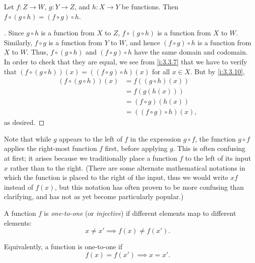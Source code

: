 \setcounter{thm}{11}
\begin{lem}\label{i:3.3.12}
  Let \(f : Z \to W\), \(g : Y \to Z\), and \(h : X \to Y\) be functions.
  Then \(f \circ (g \circ h) = (f \circ g) \circ h\).
\end{lem}

\begin{proof}[]
  Since \(g \circ h\) is a function from \(X\) to \(Z\), \(f \circ (g \circ h)\) is a function from \(X\) to \(W\).
  Similarly, \(f \circ g\) is a function from \(Y\) to \(W\), and hence \((f \circ g) \circ h\) is a function from \(X\) to \(W\).
  Thus, \(f \circ (g \circ h)\) and \((f \circ g) \circ h\) have the same domain and codomain.
  In order to check that they are equal, we see from \cref{i:3.3.7} that we have to verify that \((f \circ (g \circ h))(x) = ((f \circ g) \circ h)(x)\) for all \(x \in X\).
  But by \cref{i:3.3.10},
  \begin{align*}
    (f \circ (g \circ h))(x)
     & = f((g \circ h)(x))         \\
     & = f(g(h(x)))                \\
     & = (f \circ g)(h(x))         \\
     & = ((f \circ g) \circ h)(x),
  \end{align*}
  as desired.
\end{proof}

\begin{rmk}\label{i:3.3.13}
  Note that while \(g\) appears to the left of \(f\) in the expression \(g \circ f\), the function \(g \circ f\) applies the right-most function \(f\) first, before applying \(g\).
  This is often confusing at first;
  it arises because we traditionally place a function \(f\) to the left of its input \(x\) rather than to the right.
  (There are some alternate mathematical notations in which the function is placed to the right of the input, thus we would write \(xf\) instead of \(f(x)\), but this notation has often proven to be more confusing than clarifying, and has not as yet become particularly popular.)
\end{rmk}

\begin{defn}\label{i:3.3.14}
  A function \(f\) is \emph{one-to-one} (or \emph{injective}) if different elements map to different elements:
  \[
    x \neq x' \implies f(x) \neq f(x').
  \]

  Equivalently, a function is one-to-one if
  \[
    f(x) = f(x') \implies x = x'.
  \]
\end{defn}

